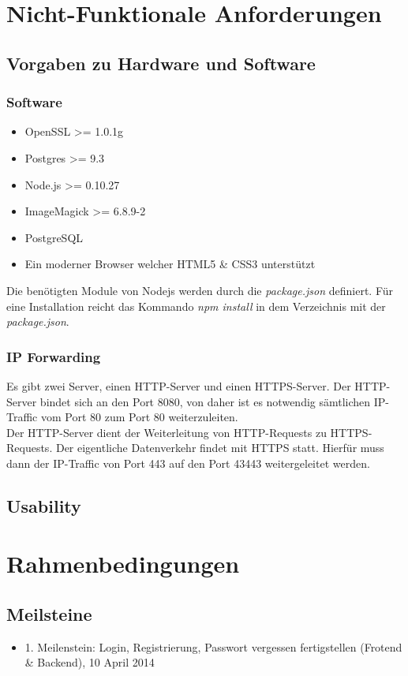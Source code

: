 \documentclass[a4paper,bibtotoc,oneside]{scrartcl}	%
\begin{document}
\section{Nicht-Funktionale Anforderungen}
	\subsection{Vorgaben zu Hardware und Software}
		\subsubsection{Software}
			\begin{itemize}
				\item OpenSSL >= 1.0.1g
				\item Postgres >= 9.3
				\item Node.js >= 0.10.27
				\item ImageMagick >= 6.8.9-2
				\item PostgreSQL
				\item Ein moderner Browser welcher HTML5 \& CSS3 unterstützt
			\end{itemize}
		
			\noindent Die benötigten Module von Nodejs werden durch die \textit{package.json} definiert.
			Für eine Installation reicht das Kommando \textit{npm install} in dem Verzeichnis mit
			der \textit{package.json}.
			
		\subsubsection{IP Forwarding}
			Es gibt zwei Server, einen HTTP-Server und einen HTTPS-Server. Der HTTP-Server bindet
			sich an den Port 8080, von daher ist es notwendig sämtlichen IP-Traffic vom Port 80
			zum Port 80 weiterzuleiten.\\
			
			\noindent Der HTTP-Server dient der Weiterleitung von HTTP-Requests zu HTTPS-Requests.
			Der eigentliche Datenverkehr findet mit HTTPS statt. Hierfür muss dann der IP-Traffic
			von Port 443 auf den Port 43443 weitergeleitet werden.
	\subsection{Usability}

\section{Rahmenbedingungen}
\subsection{Meilsteine}
	\begin{itemize}
		\item 1. Meilenstein: Login, Registrierung, Passwort vergessen fertigstellen (Frotend \& Backend), 10 April 2014

	\end{itemize}
\end{document}
